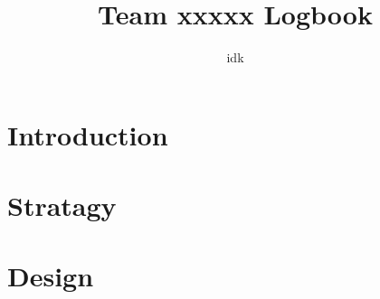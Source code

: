 \documentclass{book}
\title{Team xxxxx Logbook}
\author{idk}
\begin{document}
\maketitle
\tableofcontents

\part{Introduction}


\part{Stratagy}


\part{Design}

\end{document}
